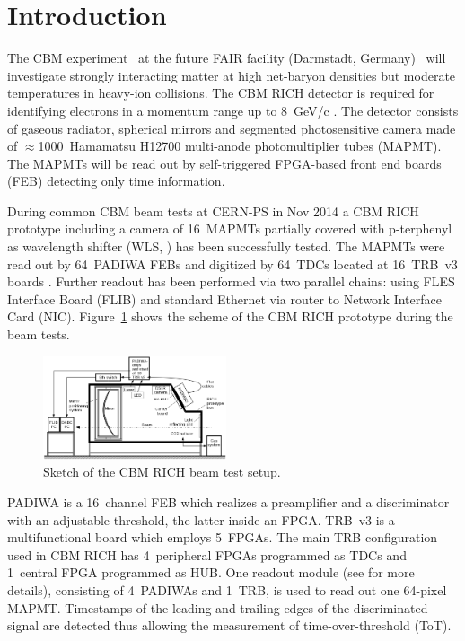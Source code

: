 \documentclass[final,5p,times,twocolumn]{elsarticle}
\begin{document}
\section{Introduction}

The CBM experiment~\cite{CBM} at the future FAIR facility (Darmstadt, Germany)~\cite{FAIR} will investigate strongly interacting matter at high net-baryon densities but moderate temperatures in heavy-ion collisions. The CBM RICH detector is required for identifying electrons in a momentum range up to 8~GeV/c \cite{CBMRICHPROJECT}. The detector consists of gaseous radiator, spherical mirrors and segmented photosensitive camera made of $\approx$1000~Hamamatsu H12700 multi-anode photomultiplier tubes (MAPMT). The MAPMTs will be read out by self-triggered FPGA-based front end boards (FEB) detecting only time information.

During common CBM beam tests at CERN-PS in Nov 2014 a CBM RICH prototype including a camera of 16~MAPMTs partially covered with p-terphenyl as wavelength shifter (WLS, \cite{WLS}) has been successfully tested. The MAPMTs were read out by 64~PADIWA FEBs and digitized by 64~TDCs located at 16~TRB~v3 boards \cite{TRB}. Further readout has been performed via two parallel chains: using FLES \cite{FLES} Interface Board (FLIB) and standard Ethernet via router to Network Interface Card (NIC). Figure~\ref{fig:BeamSetup} shows the scheme of the CBM RICH prototype during the beam tests.

\begin{figure}[tbh]
	\centering
	\includegraphics[width=0.48\textwidth]{figures/Beamtime_eng_RICH2016_poster.png}
	\caption{Sketch of the CBM RICH beam test setup.}
	\label{fig:BeamSetup}
\end{figure}

PADIWA is a 16~channel FEB which realizes a preamplifier and a discriminator with an adjustable threshold, the latter inside an FPGA. TRB~v3 is a multifunctional board which employs 5~FPGAs. The main TRB configuration used in CBM RICH has 4~peripheral FPGAs programmed as TDCs \cite{TDC} and 1~central FPGA programmed as HUB. One readout module (see \cite{PEPAN} for more details), consisting of 4~PADIWAs and 1~TRB, is used to read out one 64-pixel MAPMT. Timestamps of the leading and trailing edges of the discriminated signal are detected thus allowing the measurement of time-over-threshold (ToT).
\end{document}
